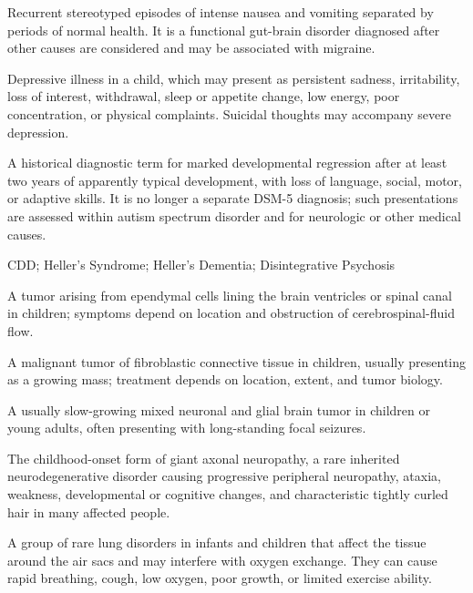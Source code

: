  Recurrent stereotyped episodes of intense nausea and vomiting separated by periods of normal health. It is a functional gut-brain disorder diagnosed after other causes are considered and may be associated with migraine.

 Depressive illness in a child, which may present as persistent sadness, irritability, loss of interest, withdrawal, sleep or appetite change, low energy, poor concentration, or physical complaints. Suicidal thoughts may accompany severe depression.

 A historical diagnostic term for
marked developmental regression after at least two years of apparently typical
development, with loss of language, social, motor, or adaptive skills. It is
no longer a separate DSM-5 diagnosis; such presentations are assessed within
autism spectrum disorder and for neurologic or other medical causes.

\synonyms
CDD; Heller's Syndrome; Heller's Dementia; Disintegrative Psychosis

 A tumor arising from ependymal cells lining the brain ventricles or spinal canal in children; symptoms depend on location and obstruction of cerebrospinal-fluid flow.

 A malignant tumor of fibroblastic connective tissue in children, usually presenting as a growing mass; treatment depends on location, extent, and tumor biology.

 A usually slow-growing mixed neuronal and glial brain tumor in children or young adults, often presenting with long-standing focal seizures.

 The childhood-onset form of giant axonal neuropathy, a rare inherited neurodegenerative disorder causing progressive peripheral neuropathy, ataxia, weakness, developmental or cognitive changes, and characteristic tightly curled hair in many affected people.

 A group of rare lung disorders in infants and children that affect the tissue around the air sacs and may interfere with oxygen exchange. They can cause rapid breathing, cough, low oxygen, poor growth, or limited exercise ability.


